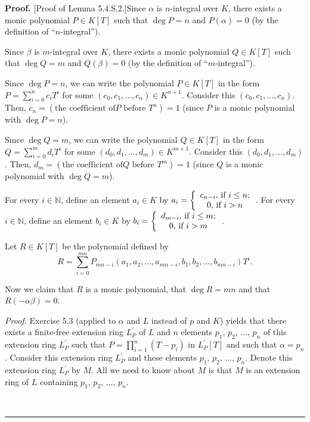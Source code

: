 \documentclass[numbers=enddot,12pt,final,onecolumn,notitlepage]{scrartcl}%
\newenvironment{proof}[1][Proof]{\noindent\textbf{#1.} }{\ \rule{0.5em}{0.5em}}
\begin{document}
\begin{proof}
[Proof of Lemma 5.4.S.2.]Since $\alpha$ is $n$-integral over $K$, there exists
a monic polynomial $P\in K\left[  T\right]  $ such that $\deg P=n$ and
$P\left(  \alpha\right)  =0$ (by the definition of ``$n$-integral'').

Since $\beta$ is $m$-integral over $K$, there exists a monic polynomial $Q\in
K\left[  T\right]  $ such that $\deg Q=m$ and $Q\left(  \beta\right)  =0$ (by
the definition of ``$m$-integral'').

Since $\deg P=n$, we can write the polynomial $P\in K\left[  T\right]  $ in
the form $P=\sum\limits_{i=0}^{n}c_{i}T^{i}$ for some $\left(  c_{0}%
,c_{1},...,c_{n}\right)  \in K^{n+1}$. Consider this $\left(  c_{0}%
,c_{1},...,c_{n}\right)  $. Then, $c_{n}=\left(  \text{the coefficient of
}P\text{ before }T^{n}\right)  =1$ (since $P$ is a monic polynomial with $\deg
P=n$).

Since $\deg Q=m$, we can write the polynomial $Q\in K\left[  T\right]  $ in
the form $Q=\sum\limits_{i=0}^{m}d_{i}T^{i}$ for some $\left(  d_{0}%
,d_{1},...,d_{m}\right)  \in K^{m+1}$. Consider this $\left(  d_{0}%
,d_{1},...,d_{m}\right)  $. Then, $d_{m}=\left(  \text{the coefficient of
}Q\text{ before }T^{m}\right)  =1$ (since $Q$ is a monic polynomial with $\deg
Q=m$).

For every $i\in\mathbb{N}$, define an element $a_{i}\in K$ by $a_{i}=\left\{
\begin{array}
[c]{c}%
c_{n-i}\text{, if }i\leq n;\\
0\text{, if }i>n
\end{array}
\right.  $. For every $i\in\mathbb{N}$, define an element $b_{i}\in K$ by
$b_{i}=\left\{
\begin{array}
[c]{c}%
d_{m-i}\text{, if }i\leq m;\\
0\text{, if }i>m
\end{array}
\right.  $.

Let $R\in K\left[  T\right]  $ be the polynomial defined by%
\[
R=\sum\limits_{i=0}^{mn}P_{mn-i}\left(  a_{1},a_{2},...,a_{mn-i},b_{1}%
,b_{2},...,b_{mn-i}\right)  T^{i}.
\]


Now we claim that $R$ is a monic polynomial, that $\deg R=mn$ and that
$R\left(  -\alpha\beta\right)  =0$.

\textit{Proof.} Exercise 5.3 (applied to $\alpha$ and $L$ instead of $p$ and
$K$) yields that there exists a finite-free extension ring $L_{P}^{\prime}$ of
$L$ and $n$ elements $p_{1}$, $p_{2}$, $...$, $p_{n}$ of this extension ring
$L_{P}^{\prime}$ such that $P=\prod\limits_{i=1}^{n}\left(  T-p_{i}\right)  $
in $L_{P}^{\prime}\left[  T\right]  $ and such that $\alpha=p_{n}$. Consider
this extension ring $L_{P}^{\prime}$ and these elements $p_{1}$, $p_{2}$,
$...$, $p_{n}$. Denote this extension ring $L_{P}^{\prime}$ by $M$. All we
need to know about $M$ is that $M$ is an extension ring of $L$ containing
$p_{1}$, $p_{2}$, $...$, $p_{n}$.


\end{proof}
\end{document}
